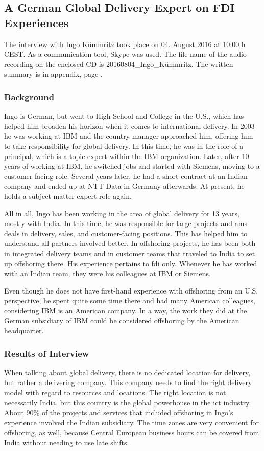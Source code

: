 \subsection{A German Global Delivery Expert on FDI Experiences}
The interview with Ingo K\"ummritz took place on 04. August 2016 at 10:00 h CEST. As a communication tool, Skype was used. The file name of the audio recording on the enclosed CD is 20160804\_Ingo\_K\"ummritz. The written summary is in appendix, page \pageref{int:Ingo}.

\subsubsection{Background}
Ingo is German, but went to High School and College in the U.S., which has helped him broaden his horizon when it comes to international delivery. In 2003 he was working at IBM and the country manager approached him, offering him to take responsibility for global delivery. In this time, he was in the role of a principal, which is a topic expert within the IBM organization. Later, after 10 years of working at IBM, he switched jobs and started with Siemens, moving to a customer-facing role. Several years later, he had a short contract at an Indian company and ended up at NTT Data in Germany afterwards. At present, he holds a subject matter expert role again.

All in all, Ingo has been working in the area of global delivery for 13 years, mostly with India. In this time, he was responsible for large projects and \gls{ams} deals in delivery, sales, and customer-facing positions. This has helped him to understand all partners involved better. In offshoring projects, he has been both in integrated delivery teams and in customer teams that traveled to India to set up offshoring there. His experience pertains to \gls{fdi} only. Whenever he has worked with an Indian team, they were his colleagues at IBM or Siemens.

Even though he does not have first-hand experience with offshoring from an U.S. perspective, he spent quite some time there and had many American colleagues, considering IBM is an American company. In a way, the work they did at the German subsidiary of IBM could be considered offshoring by the American headquarter.

\subsubsection{Results of Interview}
When talking about global delivery, there is no dedicated location for delivery, but rather a delivering company. This company needs to find the right delivery model with regard to resources and locations. The right location is not necessarily India, but this country is the global powerhouse in the \gls{ict} industry. About 90\% of the projects and services that included offshoring in Ingo's experience involved the Indian subsidiary. The time zones are very convenient for offshoring, as well, because Central European business hours can be covered from India without needing to use late shifts.

